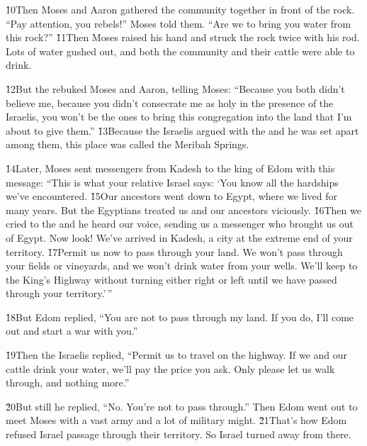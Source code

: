 \v{10}Then Moses and Aaron gathered the community together in front of the rock. ``Pay attention, you rebels!'' Moses told them. ``Are we to bring you water from this rock?'' \v{11}Then Moses raised his hand and struck the rock twice with his rod. Lots of water gushed out, and both the community and their cattle were able to drink.

\v{12}But the  rebuked Moses and Aaron, telling Moses: ``Because you both didn't believe me, because you didn't consecrate me as holy in the presence of the Israelis, you won't be the ones to bring this congregation into the land that I'm about to give them.'' \v{13}Because the Israelis argued with the  and he was set apart among them, this place was called the Meribah Springs.

\v{14}Later, Moses sent messengers from Kadesh to the king of Edom with this message: ``This is what your relative Israel says: `You know all the hardships we've encountered. \v{15}Our ancestors went down to Egypt, where we lived for many years. But the Egyptians treated us and our ancestors viciously. \v{16}Then we cried to the  and he heard our voice, sending us a messenger who brought us out of Egypt. Now look! We've arrived in Kadesh, a city at the extreme end of your territory. \v{17}Permit us now to pass through your land. We won't pass through your fields or vineyards, and we won't drink water from your wells. We'll keep to the King's Highway without turning either right or left until we have passed through your territory.'\,''

\v{18}But Edom replied, ``You are not to pass through my land. If you do, I'll come out and start a war with you.''

\v{19}Then the Israelis replied, ``Permit us to travel on the highway. If we and our cattle drink your water, we'll pay the price you ask. Only please let us walk through, and nothing more.''

\v{20}But still he replied, ``No. You're not to pass through.'' Then Edom went out to meet Moses with a vast army and a lot of military might. \v{21}That's how Edom refused Israel passage through their territory. So Israel turned away from there.

